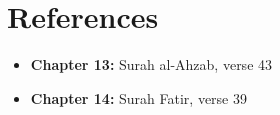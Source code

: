 \chapter{References}

\begin{itemize}
    \item \textbf{Chapter 13:} Surah al-Ahzab, verse 43
    \item \textbf{Chapter 14:} Surah Fatir, verse 39
\end{itemize}